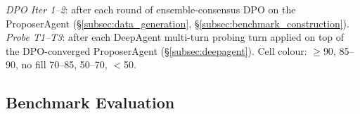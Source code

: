 \documentclass[lettersize,journal]{IEEEtran}
\begin{document}
\begin{table}[t]
{%
\emph{DPO Iter 1--2}: after each round of ensemble-consensus DPO on the ProposerAgent (\S\ref{subsec:data_generation}, \S\ref{subsec:benchmark_construction}).
\emph{Probe T1--T3}: after each DeepAgent multi-turn probing turn applied on top of the DPO-converged ProposerAgent (\S\ref{subsec:deepagent}).
Cell colour: $\geq$90, 85--90, no fill 70--85, 50--70, $<$50.}
\label{tab:benchmark_building}
\end{table}

\subsection{Benchmark Evaluation}
\label{subsec:exp_benchmark}
\end{document}
